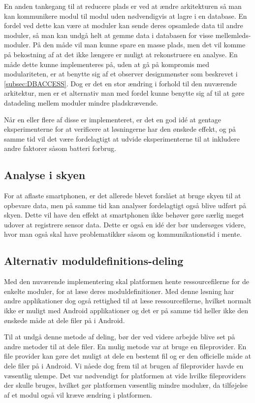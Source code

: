 En anden tankegang til at reducere plads er ved at ændre arkitekturen så man kan kommunikere modul til modul uden nødvendigvis at lagre i en database.
En fordel ved dette kan være at moduler kan sende deres opsamlede data til andre moduler, så man kan undgå helt at gemme data i databasen for visse mellemleds-moduler.
På den måde vil man kunne spare en masse plads, men det vil komme på bekostning af at det ikke længere er muligt at rekonstruere en analyse. En måde dette kunne implementeres på, uden at gå på kompromis med modulariteten, er at benytte sig af et observer designmønster som beskrevet i \cref{subsec:DBACCESS}.
Dog er det en stor ændring i forhold til den nuværende arkitektur, men er et alternativ man med fordel kunne benytte sig af til at gøre datadeling mellem moduler mindre pladskrævende.

Når en eller flere af disse er implementeret, er det en god idé at gentage eksperimenterne for at verificere at løsningerne har den ønskede effekt, og på samme tid vil det være fordelagtigt at udvide eksperimenterne til at inkludere andre faktorer såsom batteri forbrug.

\subsection{Analyse i skyen}
For at aflaste smartphonen, er det allerede blevet forslået at bruge skyen til at opbevare data, men på samme tid kan analyser fordelagtigt også blive udført på skyen. 
Dette vil have den effekt at smartphonen ikke behøver gøre særlig meget udover at registrere sensor data.
Dette er også en idé der bør undersøges videre, hvor man også skal have problematikker såsom  og kommunikationstid i mente.

\subsection{Alternativ moduldefinitions-deling}
Med den nuværende implementering skal platformen hente ressourcefilerne for de enkelte moduler, for at læse deres moduldefinitioner.
Med denne løsning har andre applikationer dog også rettighed til at læse ressourcefilerne, hvilket normalt ikke er muligt med Android applikationer og det er på samme tid heller ikke den ønskede måde at dele filer på i Android.

Til at undgå denne metode af deling, bør der ved videre arbejde blive set på andre metoder til at dele filer.
En mulig metode var at bruge en fileprovider.
En file provider kan gøre det muligt at dele en bestemt fil og er den officielle måde at dele filer på i Android.
Vi nåede dog frem til at brugen af fileprovider havde en væsentlig ulempe.
Det var nødvendigt for platformen at vide hvilke fileproviders der skulle bruges, hvilket gør platformen væsentlig mindre modulær, da tilføjelse af et modul også vil kræve ændring i platformen.


